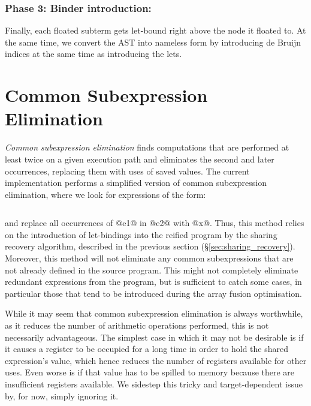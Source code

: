 \subsubsection*{Phase 3: Binder introduction:}

Finally, each floated subterm gets let-bound right above the node it floated to.
At the same time, we convert the AST into nameless  form by
introducing de Bruijn indices at the same time as introducing the lets.


\section{Common Subexpression Elimination}
\label{sec:cse}

\emph{Common subexpression elimination} finds computations that are performed at
least twice on a given execution path and eliminates the second and later
occurrences, replacing them with uses of saved values. The current
implementation performs a simplified version of common subexpression
elimination, where we look for expressions of the form:
%
\begin{lstlisting}[style=Haskell,numbers=none]
%\bf$\langle$ common subexpression elimination $\rangle$% let x = e1 in [x/e1]e2
\end{lstlisting}
%
and replace all occurrences of @e1@ in @e2@ with @x@. Thus, this method relies on the
introduction of let-bindings into the reified program by the sharing recovery algorithm, described
in the previous section (\S\ref{sec:sharing_recovery}). Moreover, this method will not eliminate any
common subexpressions that are not already defined in the source program. This might not completely
eliminate redundant expressions from the program, but is sufficient to catch some cases, in
particular those that tend to be introduced during the array fusion optimisation.

While it may seem that common subexpression elimination is always worthwhile, as
it reduces the number of arithmetic operations performed, this is not
necessarily advantageous. The simplest case in which it may not be desirable is
if it causes a register to be occupied for a long time in order to hold the
shared expression's value, which hence reduces the number of registers available
for other uses. Even worse is if that value has to be spilled to memory because
there are insufficient registers available. We sidestep this tricky and
target-dependent issue by, for now, simply ignoring it.


